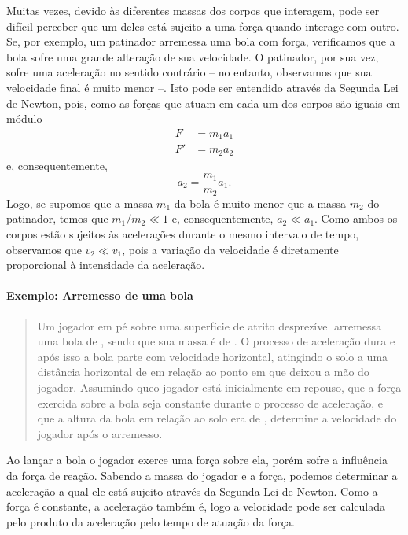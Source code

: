 Muitas vezes, devido às diferentes massas dos corpos que interagem, pode ser difícil perceber que um deles está sujeito a uma força quando interage com outro. Se, por exemplo, um patinador arremessa uma bola com força, verificamos que a bola sofre uma grande alteração de sua velocidade. O patinador, por sua vez, sofre uma aceleração no sentido contrário -- no entanto, observamos que sua velocidade final é muito menor --. Isto pode ser entendido através da Segunda Lei de Newton, pois, como as forças que atuam  em cada um dos corpos são iguais em módulo
\begin{align}
  F &= m_1 a_1 \\
  F' &= m_2 a_2
\end{align}
%
e, consequentemente,
\begin{equation}
  a_2 = \frac{m_1}{m_2} a_1.
\end{equation}
%
Logo, se supomos que a massa $m_1$ da bola é muito menor que a massa $m_2$ do patinador, temos que $m_1/m_2 \ll 1$ e, consequentemente, $a_2 \ll a_1$. Como ambos os corpos estão sujeitos às acelerações durante o mesmo intervalo de tempo, observamos que $v_2 \ll v_1$, pois a variação da velocidade é diretamente proporcional à intensidade da aceleração.

\paragraph{Exemplo: Arremesso de uma bola}

\begin{quote}
    Um jogador em pé sobre uma superfície de atrito desprezível arremessa uma bola de , sendo que sua massa é de . O processo de aceleração dura  e após isso a bola parte com velocidade horizontal, atingindo o solo a uma distância horizontal de  em relação ao ponto em que deixou a mão do jogador. Assumindo queo  jogador está inicialmente em repouso, que a força exercida sobre a bola seja constante durante o processo de aceleração, e que a altura da bola em relação ao solo era de , determine a velocidade do jogador após o arremesso.
\end{quote}

Ao lançar a bola o jogador exerce uma força sobre ela, porém sofre a influência da força de reação. Sabendo a massa do jogador e a força, podemos determinar a aceleração a qual ele está sujeito através da Segunda Lei de Newton. Como a força é constante, a aceleração também é, logo a velocidade pode ser calculada pelo produto da aceleração pelo tempo de atuação da força.

